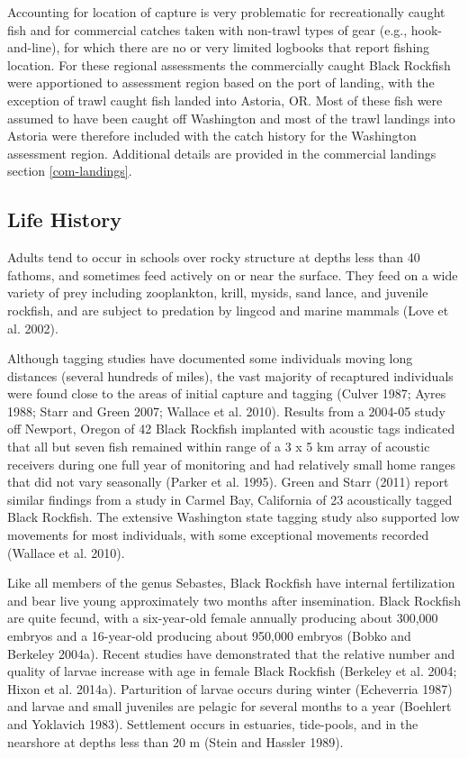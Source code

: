 \documentclass[11pt,
  english,
  letterpaper,
]{article}
\begin{document}
Accounting for location of capture is very problematic for recreationally caught fish and for commercial catches taken with non-trawl types of gear (e.g., hook-and-line), for which there are no or very limited logbooks that report fishing location. For these regional assessments the commercially caught Black Rockfish were apportioned to assessment region based on the port of landing, with the exception of trawl caught fish landed into Astoria, OR. Most of these fish were assumed to have been caught off Washington and most of the trawl landings into Astoria were therefore included with the catch history for the Washington assessment region. Additional details are provided in the commercial landings section \ref{com-landings}.

\hypertarget{life-history}{%
\subsection{Life History}\label{life-history}}

Adults tend to occur in schools over rocky structure at depths less than 40 fathoms, and sometimes feed actively on or near the surface. They feed on a wide variety of prey including zooplankton, krill, mysids, sand lance, and juvenile rockfish, and are subject to predation by lingcod and marine mammals (Love et al. 2002).

Although tagging studies have documented some individuals moving long distances (several hundreds of miles), the vast majority of recaptured individuals were found close to the areas of initial capture and tagging (Culver 1987; Ayres 1988; Starr and Green 2007; Wallace et al. 2010). Results from a 2004-05 study off Newport, Oregon of 42 Black Rockfish implanted with acoustic tags indicated that all but seven fish remained within range of a 3 x 5 km array of acoustic receivers during one full year of monitoring and had relatively small home ranges that did not vary seasonally (Parker et al. 1995). Green and Starr (2011) report similar findings from a study in Carmel Bay, California of 23 acoustically tagged Black Rockfish. The extensive Washington state tagging study also supported low movements for most individuals, with some exceptional movements recorded (Wallace et al. 2010).

Like all members of the genus Sebastes, Black Rockfish have internal fertilization and bear live young approximately two months after insemination. Black Rockfish are quite fecund, with a six-year-old female annually producing about 300,000 embryos and a 16-year-old producing about 950,000 embryos (Bobko and Berkeley 2004a). Recent studies have demonstrated that the relative number and quality of larvae increase with age in female Black Rockfish (Berkeley et al. 2004; Hixon et al. 2014a). Parturition of larvae occurs during winter (Echeverria 1987) and larvae and small juveniles are pelagic for several months to a year (Boehlert and Yoklavich 1983). Settlement occurs in estuaries, tide-pools, and in the nearshore at depths less than 20 m (Stein and Hassler 1989).
\end{document}
